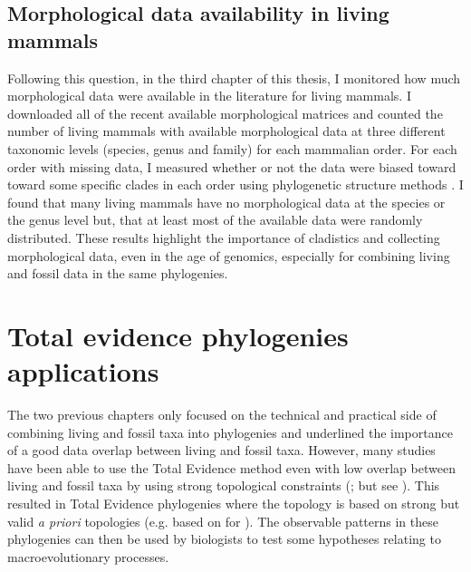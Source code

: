 \subsection{Morphological data availability in living mammals}
Following this question, in the third chapter of this thesis, I monitored how much morphological data were available in the literature for living mammals.
I downloaded all of the recent available morphological matrices and counted the number of living mammals with available morphological data at three different taxonomic levels (species, genus and family) for each mammalian order.
For each order with missing data, I measured whether or not the data were biased toward toward some specific clades in each order using phylogenetic structure methods \citep{webb2002phylogenies}.
I found that many living mammals have no morphological data at the species or the genus level but, that at least most of the available data were randomly distributed.
These results highlight the importance of cladistics and collecting morphological data, even in the age of genomics, especially for combining living and fossil data in the same phylogenies.

\section{Total evidence phylogenies applications}
The two previous chapters only focused on the technical and practical side of combining living and fossil taxa into phylogenies and underlined the importance of a good data overlap between living and fossil taxa.
However, many studies have been able to use the Total Evidence method even with low overlap between living and fossil taxa by using strong topological constraints (\citealt{ronquista2012,schragocombining2013,slaterphylogenetic2013,beckancient2014}; but see \citealt{Arcila2015131,Dembo2015}).
This resulted in Total Evidence phylogenies where the topology is based on strong but valid \textit{a priori} topologies (e.g. based on \citealt{meredithimpacts2011} for \citealt{slaterphylogenetic2013}).
The observable patterns in these phylogenies can then be used by biologists to test some hypotheses relating to macroevolutionary processes.

